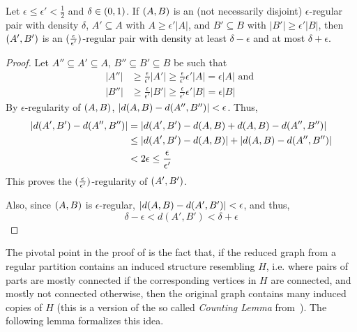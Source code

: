         \begin{lemma} \label{lem:regularity_is_transitive}
            Let $\epsilon \leq \epsilon' < \frac{1}{2}$ and $\delta \in ( 0, 1 )$.
            If $( A,B )$ is an (not necessarily disjoint) $\epsilon$-regular pair with density $\delta$, $A' \subseteq A$ with
            $A \geq \epsilon' |A|$, and $B' \subseteq B$ with $|B'| \geq \epsilon' |B|$, then $( A', B' )$ is an
            $( \frac{\epsilon}{\epsilon'} )$-regular pair with density at least $\delta - \epsilon$ and at most $\delta + \epsilon$.
            \begin{proof}
                Let $A'' \subseteq A' \subseteq A$, $B'' \subseteq B' \subseteq B$ be such that
                \begin{align*}
                    |A''| & \geq \frac{\epsilon}{\epsilon'} |A'| \geq \frac{\epsilon}{\epsilon'} \epsilon' |A| = \epsilon |A|
                    \text{ and } \\
                    |B''| & \geq \frac{\epsilon}{\epsilon'} |B'| \geq \frac{\epsilon}{\epsilon'} \epsilon' |B| = \epsilon |B|
                \end{align*}
                By $\epsilon$-regularity of $( A,B )$, $| d(A,B) - d(A'',B'') | < \epsilon$.
                Thus,
                \begin{align*}
                    | d(A',B') - d(A'',B'') |
                        & = | d(A',B') - d(A,B) + d(A,B) - d(A'',B'') | \\
                        & \leq | d(A',B') - d(A,B) | + | d(A,B) - d(A'',B'') | \\
                        & < 2 \epsilon \leq \frac{\epsilon}{\epsilon'}
                \end{align*}
                This proves the $( \frac{\epsilon}{\epsilon'} )$-regularity of $( A',B' )$.

                Also, since $( A,B )$ is $\epsilon$-regular, $| d(A,B) - d(A',B') | < \epsilon$,
                and thus,
                \[
                    \delta - \epsilon < d(A',B') < \delta + \epsilon
                \]
            \end{proof}
        \end{lemma}

        The pivotal point in the proof of  is the fact that, if the
        reduced graph  from a regular partition contains an induced structure resembling $H$, i.e. where pairs of parts are
        mostly connected if the corresponding vertices in $H$ are connected, and mostly not connected otherwise,
        then the original graph contains many induced copies of $H$ (this is a version of the so called \emph{Counting Lemma}
        from~\cite{the_regulariy_lemma_and_its_applications_in_graph_theory}).
        The following lemma formalizes this idea.


